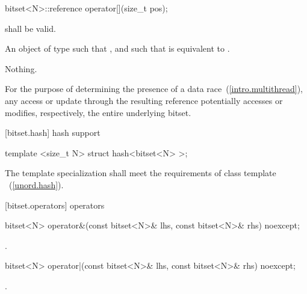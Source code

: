 \begin{itemdecl}
bitset<N>::reference operator[](size_t pos);
\end{itemdecl}

\begin{itemdescr}
\pnum
\requires
{} shall be valid.

\pnum
\returns
An object of type
such that
,
and such that
is equivalent to
.

\pnum
\throws Nothing.

\pnum
\remark For the purpose of determining the presence of a data
race~(\ref{intro.multithread}), any access or update through the resulting
reference potentially accesses or modifies, respectively, the entire
underlying bitset.
\end{itemdescr}

[bitset.hash]{ hash support}

%
\begin{itemdecl}
template <size_t N> struct hash<bitset<N> >;
\end{itemdecl}

\begin{itemdescr}
\pnum The template specialization shall meet the requirements of class template
~(\ref{unord.hash}).
\end{itemdescr}


[bitset.operators]{ operators}

%
\begin{itemdecl}
bitset<N> operator&(const bitset<N>& lhs, const bitset<N>& rhs) noexcept;
\end{itemdecl}

\begin{itemdescr}
\pnum
\returns
{}.
\end{itemdescr}

%
\begin{itemdecl}
bitset<N> operator|(const bitset<N>& lhs, const bitset<N>& rhs) noexcept;
\end{itemdecl}

\begin{itemdescr}
\pnum
\returns
{}.
\end{itemdescr}

